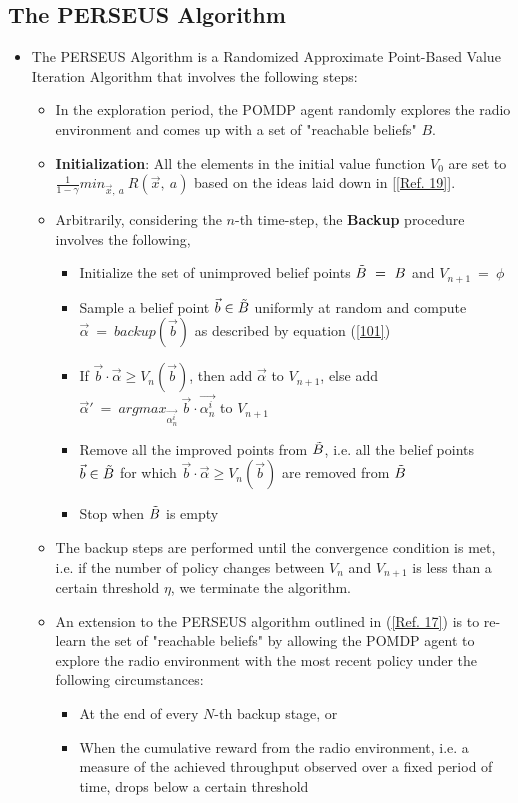 \documentclass[12pt, draftcls, onecolumn]{IEEEtran}
\begin{document}
\subsection{The PERSEUS Algorithm}
\begin{itemize}
    \item The PERSEUS Algorithm is a Randomized Approximate Point-Based Value Iteration Algorithm that involves the following steps:
    \begin{itemize}
        \item In the exploration period, the POMDP agent randomly explores the radio environment and comes up with a set of "reachable beliefs" $B$.
        \item \textbf{Initialization}: All the elements in the initial value function $V_0$ are set to $\frac{1}{1-\gamma}min_{\vec{x},\ a}\ R(\vec{x},\ a)$ based on the ideas laid down in [\ref{Ref. 19}].
        \item Arbitrarily, considering the $n$-th time-step, the \textbf{Backup} procedure involves the following,
        \begin{itemize}
            \item Initialize the set of unimproved belief points $\Tilde{B}\ =\ B$ and $V_{n+1}\ =\ \phi$
            \item Sample a belief point $\vec{b} \in \Tilde{B}$ uniformly at random and compute $\vec{\alpha}\ =\ backup(\vec{b})$ as described by equation (\ref{101})
            \item If $\vec{b} \cdot \vec{\alpha} \geq V_n(\vec{b})$, then add $\vec{\alpha}$ to $V_{n+1}$, else add $\vec{\alpha}'\ =\ argmax_{\vec{\alpha_n^i}}\ \vec{b} \cdot \vec{\alpha_n^i}$ to $V_{n+1}$
            \item Remove all the improved points from $\Tilde{B}$, i.e. all the belief points $\vec{b} \in \Tilde{B}$ for which $\vec{b} \cdot \vec{\alpha} \geq V_n(\vec{b})$ are removed from $\Tilde{B}$
            \item Stop when $\Tilde{B}$ is empty
        \end{itemize}
        \item The backup steps are performed until the convergence condition is met, i.e. if the number of policy changes between $V_{n}$ and $V_{n+1}$ is less than a certain threshold $\eta$, we terminate the algorithm.
        \item An extension to the PERSEUS algorithm outlined in (\ref{Ref. 17}) is to re-learn the set of "reachable beliefs" by allowing the POMDP agent to explore the radio environment with the most recent policy under the following circumstances:
        \begin{itemize}
            \item At the end of every $N$-th backup stage, or
            \item When the cumulative reward from the radio environment, i.e. a measure of the achieved throughput observed over a fixed period of time, drops below a certain threshold
        \end{itemize}
    \end{itemize}
\end{itemize}
\end{document}
